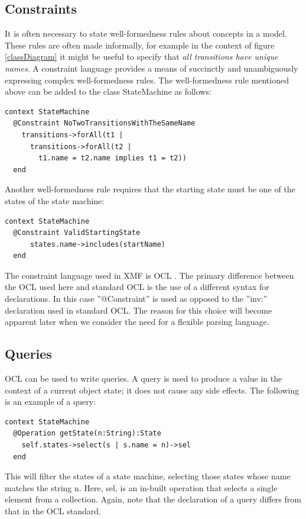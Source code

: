 \subsection{Constraints}

It is often necessary to state well-formedness rules about
concepts in a model. These rules are often made informally, for
example in the context of figure \ref{classDiagram} it might be
useful to specify that \emph{all transitions have unique names}. A
constraint language provides a means of succinctly and
unambiguously expressing complex well-formedness rules. The
well-formedness rule mentioned above can be added to the class
StateMachine as follows:


\begin{lstlisting}
context StateMachine
  @Constraint NoTwoTransitionsWithTheSameName
    transitions->forAll(t1 |
      transitions->forAll(t2 |
        t1.name = t2.name implies t1 = t2))
  end
\end{lstlisting}Another well-formedness rule requires that the starting state must
be one of the states of the state machine:

\begin{lstlisting}
context StateMachine
  @Constraint ValidStartingState
      states.name->includes(startName)
  end
\end{lstlisting}The constraint language used in XMF is OCL \cite{oclBook}. The
primary difference between the OCL used here and standard OCL is
the use of a different syntax for declarations. In this case
''@Constraint'' is used as opposed to the ''inv:'' declaration
used in standard OCL. The reason for this choice will become
apparent later when we consider the need for a flexible parsing
language.

\subsection{Queries}

OCL can be used to write queries. A query is used to produce a
value in the context of a current object state; it does not cause
any side effects. The following is an example of a query:


\begin{lstlisting}
context StateMachine
  @Operation getState(n:String):State
    self.states->select(s | s.name = n)->sel
  end
\end{lstlisting}
This will filter the states of a state machine, selecting those
states whose name matches the string n. Here, sel, is an in-built
operation that selects a single element from a collection. Again,
note that the declaration of a query differs from that in the OCL
standard.


